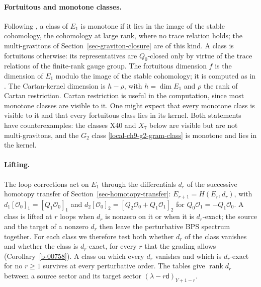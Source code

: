 \documentclass[11pt]{article}
\numberwithin{equation}{section}
\numberwithin{figure}{section}
\numberwithin{table}{section}
\begin{document}
\paragraph{Fortuitous and monotone classes.} Following \cite{microstates,ChangChevalley}, a class of $E_1$ is monotone if it lies in the image of the stable cohomology, the cohomology at large rank, where no trace relation holds; the multi-gravitons of Section~\ref{sec-graviton-closure} are of this kind. A class is fortuitous otherwise: its representatives are $Q_0$-closed only by virtue of the trace relations of the finite-rank gauge group. The fortuitous dimension $f$ is the dimension of $E_1$ modulo the image of the stable cohomology; it is computed as in \cite[supplement, Section S1.5]{Repo}. The Cartan-kernel dimension is $h-\rho$, with $h=\dim E_1$ and $\rho$ the rank of Cartan restriction. Cartan restriction is useful in the computation, since most monotone classes are visible to it. One might expect that every monotone class is visible to it and that every fortuitous class lies in its kernel. Both statements have counterexamples: the classes X40 and $X_7$ below are visible but are not multi-gravitons, and the $G_2$ class \eqref{local-ch9-g2-gram-class} is monotone and lies in the kernel.

\paragraph{Lifting.} The loop corrections act on $E_1$ through the differentials $d_r$ of the successive homotopy transfer of Section~\ref{sec-homotopy-transfer}: $E_{r+1}=H(E_r,d_r)$, with $d_1[\mathcal O_0]_1=[Q_1\mathcal O_0]_1$ and $d_2[\mathcal O_0]_2=[Q_2\mathcal O_0+Q_1\mathcal O_1]_2$ for $Q_0\mathcal O_1=-Q_1\mathcal O_0$. A class is lifted at $r$ loops when $d_r$ is nonzero on it or when it is $d_r$-exact; the source and the target of a nonzero $d_r$ then leave the perturbative BPS spectrum together. For each class we therefore test both whether $d_r$ of the class vanishes and whether the class is $d_r$-exact, for every $r$ that the grading allows (Corollary~\ref{b-00758}). A class on which every $d_r$ vanishes and which is $d_r$-exact for no $r\ge1$ survives at every perturbative order. The tables give $\operatorname{rank}d_r$ between a source sector and its target sector $(\lambda-r\mathsf d)_{Y+1-r}$.
\end{document}
